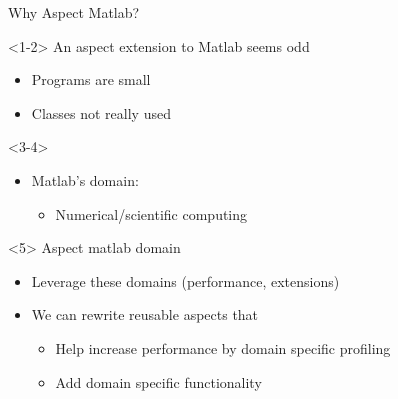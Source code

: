 \begin{frame}{Why Aspect Matlab?}
  \begin{onlyenv}<1-2>
    An aspect extension to Matlab seems odd
    \begin{itemize}
    \item Programs are small %
    \item Classes not really used
    \end{itemize}
  \end{onlyenv}
  \begin{onlyenv}<3-4>
    \begin{itemize}
    \item Matlab's domain:
      \begin{itemize}
      \item Numerical/scientific computing
      \end{itemize}
    \end{itemize}
  \end{onlyenv}
  \begin{onlyenv}<5>
    Aspect matlab domain
    \begin{itemize}
    \item Leverage these domains (performance, extensions)
    \item We can rewrite reusable aspects that
      \begin{itemize}
      \item Help increase performance by domain specific profiling
      \item Add domain specific functionality
      \end{itemize}
    \end{itemize}
  \end{onlyenv}
\end{frame}


